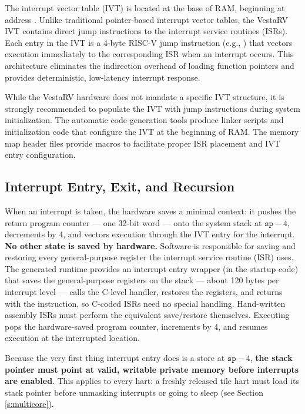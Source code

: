 \documentclass[11pt,pdftex,portrait,letterpaper]{article}
\begin{document}
The interrupt vector table (IVT) is located at the base of RAM, beginning at address \texttt{\VectorsStartAddress}. Unlike traditional pointer-based interrupt vector tables, the VestaRV IVT contains direct jump instructions to the interrupt service routines (ISRs). Each entry in the IVT is a 4-byte RISC-V jump instruction (e.g., ) that vectors execution immediately to the corresponding ISR when an interrupt occurs. This architecture eliminates the indirection overhead of loading function pointers and provides deterministic, low-latency interrupt response.

While the VestaRV hardware does not mandate a specific IVT structure, it is strongly recommended to populate the IVT with jump instructions during system initialization. The automatic code generation tools produce linker scripts and initialization code that configure the IVT at the beginning of RAM. The memory map header files provide macros to facilitate proper ISR placement and IVT entry configuration.

\subsection{Interrupt Entry, Exit, and Recursion}

When an interrupt is taken, the hardware saves a minimal context: it pushes the return program counter --- one 32-bit word --- onto the system stack at $\mathtt{sp}-4$, decrements  by 4, and vectors execution through the IVT entry for the interrupt. \textbf{No other state is saved by hardware.} Software is responsible for saving and restoring every general-purpose register the interrupt service routine (ISR) uses. The generated runtime provides an interrupt entry wrapper (in the startup code) that saves the general-purpose registers on the stack --- about 120 bytes per interrupt level --- calls the C-level handler, restores the registers, and returns with the  instruction, so C-coded ISRs need no special handling. Hand-written assembly ISRs must perform the equivalent save/restore themselves. Executing  pops the hardware-saved program counter, increments  by 4, and resumes execution at the interrupted location.

Because the very first thing interrupt entry does is a store at $\mathtt{sp}-4$, \textbf{the stack pointer must point at valid, writable private memory before interrupts are enabled}. This applies to every hart: a freshly released tile hart must load its stack pointer before unmasking interrupts or going to sleep (see Section \ref{s:multicore}).
\end{document}
